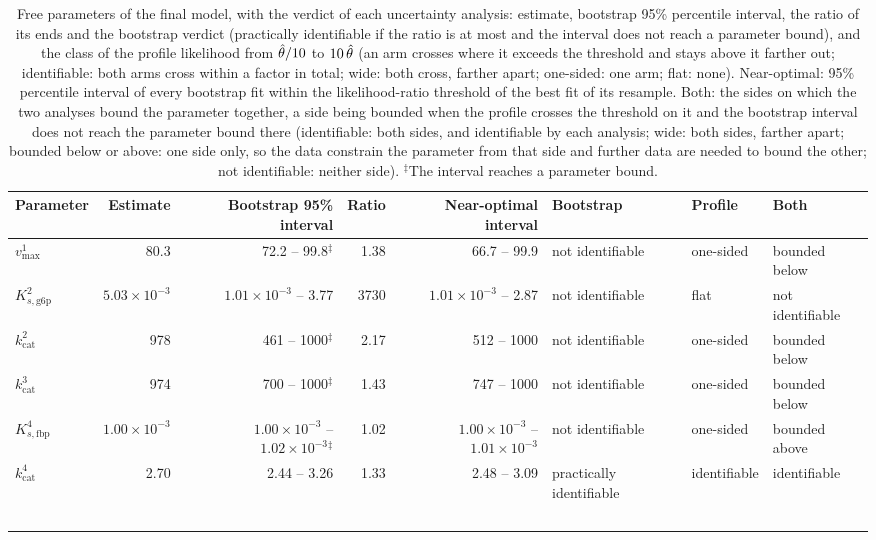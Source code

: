 \begin{table}[h]
\centering
\caption{Free parameters of the final model, with the verdict of each uncertainty analysis: estimate, bootstrap 95\% percentile interval, the ratio of its ends and the bootstrap verdict (practically identifiable if the ratio is at most \SIbootRatio{} and the interval does not reach a parameter bound), and the class of the profile likelihood from $\hat\theta/\SIprofileFactor$ to $\SIprofileFactor\,\hat\theta$ (an arm crosses where it exceeds the threshold and stays above it farther out; identifiable: both arms cross within a factor \SIbootRatio{} in total; wide: both cross, farther apart; one-sided: one arm; flat: none). Near-optimal: 95\% percentile interval of every bootstrap fit within the likelihood-ratio threshold of the best fit of its resample. Both: the sides on which the two analyses bound the parameter together, a side being bounded when the profile crosses the threshold on it and the bootstrap interval does not reach the parameter bound there (identifiable: both sides, and identifiable by each analysis; wide: both sides, farther apart; bounded below or above: one side only, so the data constrain the parameter from that side and further data are needed to bound the other; not identifiable: neither side). $^\ddagger$The interval reaches a parameter bound.}
\label{tab:free_parameters}
\begin{tabular}{lrrrrlll}
\toprule
Parameter & Estimate & Bootstrap 95\% interval & Ratio & Near-optimal interval & Bootstrap & Profile & Both \\
\midrule
$v_{\max}^{1}$ & 80.3 & 72.2 -- 99.8$^\ddagger$ & 1.38 & 66.7 -- 99.9 & not identifiable & one-sided & bounded below \\
$K_{s,\mathrm{g6p}}^{2}$ & $5.03 \times 10^{-3}$ & $1.01 \times 10^{-3}$ -- 3.77 & 3730 & $1.01 \times 10^{-3}$ -- 2.87 & not identifiable & flat & not identifiable \\
$k_{\mathrm{cat}}^{2}$ & 978 & 461 -- 1000$^\ddagger$ & 2.17 & 512 -- 1000 & not identifiable & one-sided & bounded below \\
$k_{\mathrm{cat}}^{3}$ & 974 & 700 -- 1000$^\ddagger$ & 1.43 & 747 -- 1000 & not identifiable & one-sided & bounded below \\
$K_{s,\mathrm{fbp}}^{4}$ & $1.00 \times 10^{-3}$ & $1.00 \times 10^{-3}$ -- $1.02 \times 10^{-3}$$^\ddagger$ & 1.02 & $1.00 \times 10^{-3}$ -- $1.01 \times 10^{-3}$ & not identifiable & one-sided & bounded above \\
$k_{\mathrm{cat}}^{4}$ & 2.70 & 2.44 -- 3.26 & 1.33 & 2.48 -- 3.09 & practically identifiable & identifiable & identifiable \\
$$
\end{tabular}
\end{table}
